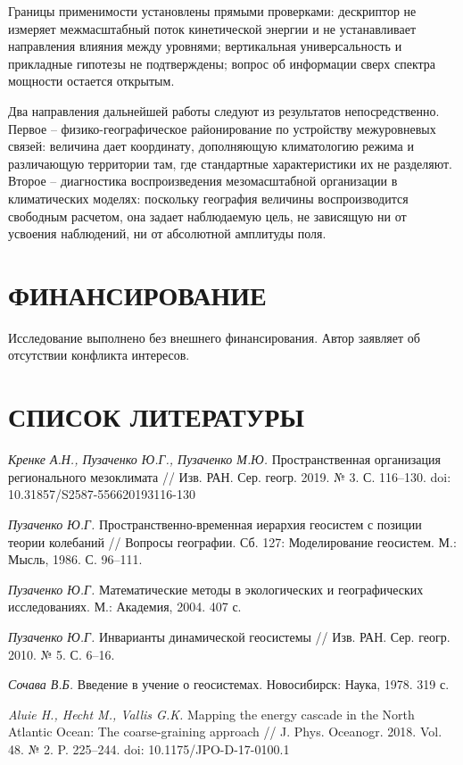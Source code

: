 \documentclass[12pt,a4paper]{article}
\begin{document}
Границы применимости установлены прямыми проверками: дескриптор не измеряет межмасштабный поток кинетической энергии и не устанавливает направления влияния между уровнями; вертикальная универсальность и прикладные гипотезы не подтверждены; вопрос об информации сверх спектра мощности остается открытым.

Два направления дальнейшей работы следуют из результатов непосредственно. Первое -- физико-географическое районирование по устройству межуровневых связей: величина дает координату, дополняющую климатологию режима и различающую территории там, где стандартные характеристики их не разделяют. Второе -- диагностика воспроизведения мезомасштабной организации в климатических моделях: поскольку география величины воспроизводится свободным расчетом, она задает наблюдаемую цель, не зависящую ни от усвоения наблюдений, ни от абсолютной амплитуды поля.

\section{ФИНАНСИРОВАНИЕ}

Исследование выполнено без внешнего финансирования. Автор заявляет об отсутствии конфликта интересов.

\clearpage
\section{СПИСОК ЛИТЕРАТУРЫ}

\noindent \textit{Кренке А.Н., Пузаченко Ю.Г., Пузаченко М.Ю.} Пространственная организация регионального мезоклимата // Изв. РАН. Сер. геогр. 2019. № 3. С. 116–130. doi: 10.31857/S2587-556620193116-130

\noindent \textit{Пузаченко Ю.Г.} Пространственно-временная иерархия геосистем с позиции теории колебаний // Вопросы географии. Сб. 127: Моделирование геосистем. М.: Мысль, 1986. С. 96–111.

\noindent \textit{Пузаченко Ю.Г.} Математические методы в экологических и географических исследованиях. М.: Академия, 2004. 407 с.

\noindent \textit{Пузаченко Ю.Г.} Инварианты динамической геосистемы // Изв. РАН. Сер. геогр. 2010. № 5. С. 6–16.

\noindent \textit{Сочава В.Б.} Введение в учение о геосистемах. Новосибирск: Наука, 1978. 319 с.

\noindent \textit{Aluie H., Hecht M., Vallis G.K.} Mapping the energy cascade in the North Atlantic Ocean: The coarse-graining approach // J. Phys. Oceanogr. 2018. Vol. 48. № 2. P. 225–244. doi: 10.1175/JPO-D-17-0100.1
\end{document}
